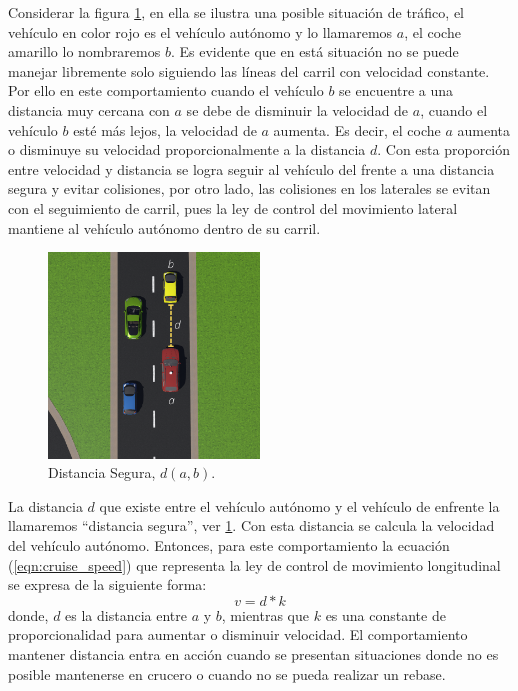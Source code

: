 Considerar la figura \ref{fig:safe_distance}, en ella se ilustra una posible situación de tráfico, el vehículo en color rojo es el vehículo autónomo y lo llamaremos $a$, el coche amarillo lo nombraremos $b$. Es evidente que en está situación no se puede manejar libremente solo siguiendo las líneas del carril con velocidad constante. Por ello en este comportamiento cuando el vehículo $b$ se encuentre a una distancia muy cercana con $a$ se debe de disminuir la velocidad de $a$, cuando el vehículo $b$ esté más lejos, la velocidad de $a$ aumenta. Es decir, el coche $a$ aumenta o disminuye su velocidad proporcionalmente a la distancia $d$. Con esta proporción entre velocidad y distancia se logra seguir al vehículo del frente a una distancia segura y evitar colisiones, por otro lado, las colisiones en los laterales se evitan con el seguimiento de carril, pues la ley de control del movimiento lateral mantiene al vehículo autónomo dentro de su carril.
\begin{figure}[h]
    \centering
    \includegraphics[width=0.5\textwidth]{Figures/Figures_Cap06/safe_distance.png}
    \caption{Distancia Segura, $d(a, b)$.}
    \label{fig:safe_distance}
\end{figure}

La distancia $d$ que existe entre el vehículo autónomo y el vehículo de enfrente la llamaremos ``distancia segura'', ver \ref{fig:safe_distance}. Con esta distancia se calcula la velocidad del vehículo autónomo. Entonces, para este comportamiento la ecuación (\ref{eqn:cruise_speed}) que representa la ley de control de movimiento longitudinal se expresa de la siguiente forma:
\begin{equation}
    v = d * k
    \label{eqn:keep_distance_velocity}
\end{equation}
donde, $d$ es la distancia entre $a$ y $b$, mientras que $k$ es una constante de proporcionalidad para aumentar o disminuir velocidad. El comportamiento mantener distancia entra en acción cuando se presentan situaciones donde no es posible mantenerse en crucero o cuando no se pueda realizar un rebase.

